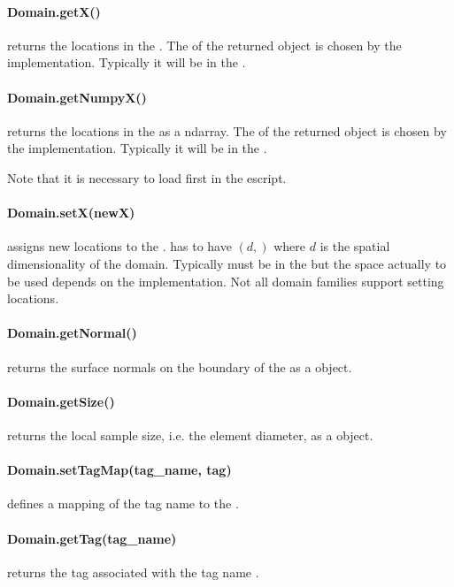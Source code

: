 %
\paragraph{Domain.getX()}
returns the locations in the \Domain. The \FunctionSpace of the returned
    \Data object is chosen by the \Domain implementation. Typically it will be
    in the \ContinuousFunction.


\paragraph{Domain.getNumpyX()}
returns the locations in the \Domain as a \numpy ndarray. The \FunctionSpace
    of the returned \Data object is chosen by the \Domain implementation.
    Typically it will be in the \ContinuousFunction.

    Note that it is necessary to load \numpy first in the escript.

%
\paragraph{Domain.setX(newX)}
assigns new locations to the \Domain.  has to have \Shape $(d,)$
    where $d$ is the spatial dimensionality of the domain. Typically 
    must be in the \ContinuousFunction but the space actually to be used
    depends on the \Domain implementation. Not all domain families support
    setting locations.

%
\paragraph{Domain.getNormal()}
returns the surface normals on the boundary of the \Domain as a \Data object.

%
\paragraph{Domain.getSize()}
returns the local sample size, i.e. the element diameter, as a \Data object.

%
\paragraph{Domain.setTagMap(tag_name, tag)}
defines a mapping of the tag name  to the .

%
\paragraph{Domain.getTag(tag_name)}
returns the tag associated with the tag name .


